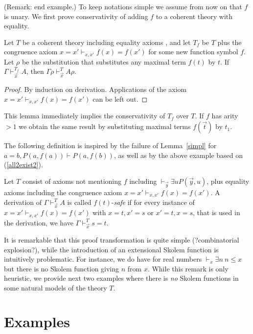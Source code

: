 \documentclass[10pt,a4paper]{article}
\begin{document}
\noindent
(Remark: end example.) To keep notations simple we assume from now on that $f$ is unary.
We first prove conservativity of adding $f$ to a coherent theory with equality.

\begin{lemma}\label{lem:eq+f=conservative}
Let $T$ be a coherent theory including equality axioms , and
let $T_f$ be $T$ plus the congruence axiom $x=x'\vdash_{x,x'} f(x) = f(x')$
for some new function symbol $f$.
Let $\rho$ be the substitution that substitutes any maximal term $f(t)$ by $t$.
If  $\Gamma \vdash_{\vec{x}}^{T_f} A$, then
$\Gamma\rho \vdash_{\vec{x}}^T A\rho$.
\end{lemma}
\begin{proof}
By induction on derivation. Applications of the axiom $x=x'\vdash_{x,x'} f(x) = f(x')$
can be left out.
\end{proof}
This lemma immediately implies the conservativity of $T_f$ over $T$.
If $f$ has arity $>1$ we obtain the same result by substituting
maximal terms $f(\vec{t})$ by $t_1$.

\medskip

The following definition is inspired by the failure of Lemma~\ref{simpl}
for $a=b,P(a,f(a)) \vdash P(a,f(b))$, as well as by the above example
based on (\ref{all2exist2}).

\begin{definition}\label{def:safederivation}
Let $T$ consist of axioms not mentioning $f$ including 
$\vdash_{\vec{y}} \exists u P(\vec{y},u)$, plus equality axioms
including the congruence axiom $x=x'\vdash_{x,x'} f(x) = f(x')$. 
A derivation of  $\Gamma \vdash_{\vec{x}}^{T} A$ is called $f(t)$-\emph{safe}
if for every instance of $x=x'\vdash_{x,x'} f(x) = f(x')$ with $x=t,x'=s$  or
$x'=t,x=s$, that is used in the derivation, we have $\Gamma \vdash_{\vec{x}}^{T} s=t$.
\end{definition}


\medskip

 It is remarkable that this proof transformation is quite simple (?combinatorial explosion?), while
the introduction of an extensional Skolem function is intuitively problematic. For instance,
we do have for real numbers $\vdash_x \exists n~n\leqslant x$ but there is no Skolem function
giving $n$ from $x$. While this remark is only heuristic, we provide next two examples where there
is {\em no} Skolem functions in some natural models of the theory $T$.

\section{Examples}
\end{document}

